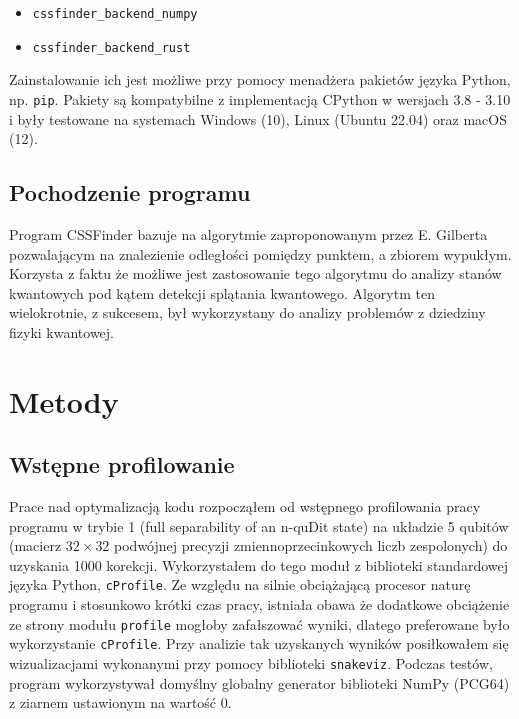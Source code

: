 \documentclass[12pt, a4paper]{article}
\newcommand{\code}[1]{\texttt{#1}}
\begin{document}
\begin{sloppypar}
\begin{itemize}
      \item \code{cssfinder\_backend\_numpy}\cite{CSSFinder_New_Numpy_PyPI}

      \item \code{cssfinder\_backend\_rust}\cite{CSSFinder_New_Rust_PyPI}
    \end{itemize}
    Zainstalowanie ich jest możliwe przy pomocy menadżera pakietów języka Python\cite{Packaging_PEPs},
    np. \code{pip}\cite{PIP}. Pakiety są kompatybilne z implementacją CPython w wersjach
    3.8 - 3.10 i były testowane na systemach Windows (10), Linux (Ubuntu 22.04) oraz macOS
    (12).

    \subsection{Pochodzenie programu}


    Program CSSFinder bazuje na algorytmie zaproponowanym przez E. Gilberta\cite{Lindemann_Gilbert}
    pozwalającym na znalezienie odległości pomiędzy punktem, a zbiorem wypukłym. Korzysta
    z faktu że możliwe jest zastosowanie tego algorytmu do analizy stanów kwantowych pod
    kątem detekcji splątania kwantowego\cite{MW_Hilbert_Schmidt_distance}\cite{MW_Gilbert_Quantum_Entanglement}.
    Algorytm ten wielokrotnie, z sukcesem, był wykorzystany do analizy problemów z
    dziedziny fizyki kwantowej\cite{MW_56_Year_Algorithm}\cite{MW_Variational_approach}.

    \section{Metody}


    \subsection{Wstępne profilowanie}


    Prace nad optymalizacją kodu rozpocząłem od wstępnego profilowania pracy programu w
    trybie 1 (full separability of an n-quDit state) na układzie 5 qubitów (macierz $32\times
    32$ podwójnej precyzji zmiennoprzecinkowych liczb zespolonych) do uzyskania 1000
    korekcji. Wykorzystałem do tego moduł z biblioteki standardowej języka Python, \code{cProfile}.
    Ze względu na silnie obciążającą procesor naturę programu i stosunkowo krótki czas
    pracy, istniała obawa że dodatkowe obciążenie ze strony modułu \code{profile}
    mogłoby zafałszować wyniki, dlatego preferowane było wykorzystanie \code{cProfile}. Przy
    analizie tak uzyskanych wyników posiłkowałem się wizualizacjami wykonanymi przy pomocy
    biblioteki \code{snakeviz}\cite{Snakeviz_PyPI}. Podczas testów, program wykorzystywał
    domyślny globalny generator biblioteki NumPy (PCG64\cite{NumpyDefaultGenerator}) z
    ziarnem ustawionym na wartość 0.


\end{sloppypar}
\end{document}
